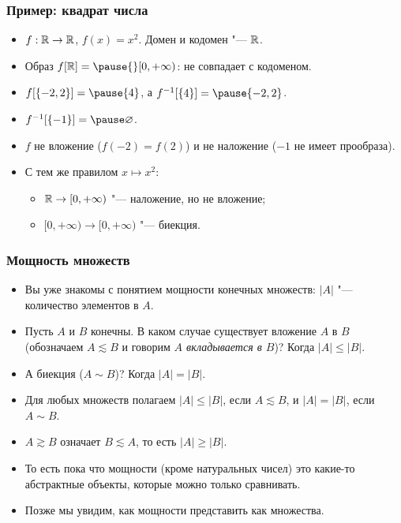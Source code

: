 \documentclass[10pt]{beamer}
\begin{document}
\begin{frame}
    \frametitle{Пример: квадрат числа}
    \begin{itemize}
        \item $f:\mathbb{R}\to\mathbb{R}$, $f(x)=x^2$. Домен и кодомен "--- $\mathbb{R}$.
        \item Образ $f[\R]=\pause{}[0,+\infty)$: не совпадает с кодоменом.
        \item $f[\{-2,2\}]=\pause\{4\}$, а $f^{-1}[\{4\}]=\pause\{-2,2\}$.
        \item $f^{-1}[\{-1\}]=\pause\varnothing$.
        \pause
        \item $f$ не вложение ($f(-2)=f(2)$) и не наложение ($-1$ не имеет прообраза).
        \pause
        \item С тем же правилом $x\mapsto x^2$:
        \begin{itemize}
            \item $\mathbb{R}\to[0,+\infty)$ "--- наложение, но не вложение;
            \item $[0,+\infty)\to[0,+\infty)$ "--- биекция.
        \end{itemize}
    \end{itemize}
\end{frame}

\begin{frame}
    \frametitle{Мощность множеств}
    \begin{itemize}
        \item Вы уже знакомы с понятием мощности конечных множеств: $|A|$ "--- количество элементов в $A$.
        \item Пусть $A$ и $B$ конечны. В каком случае существует вложение $A$ в $B$ (обозначаем $A \lesssim B$ и говорим \emph{$A$ вкладывается в $B$})? \pause Когда $|A| \leq |B|$.
        \pause
        \item А биекция ($A \sim B$)? \pause Когда $|A| = |B|$.
        \pause
        \item Для любых множеств полагаем $|A|\leq|B|$, если $A\lesssim B$, и $|A|=|B|$, если $A\sim B$.
        \item $A\gtrsim B$ означает $B\lesssim A$, то есть $|A|\geq|B|$.
        \item То есть пока что мощности (кроме натуральных чисел) это какие-то абстрактные объекты, которые можно только сравнивать.
        \item Позже мы увидим, как мощности представить как множества.
    \end{itemize}
\end{frame}
\end{document}
